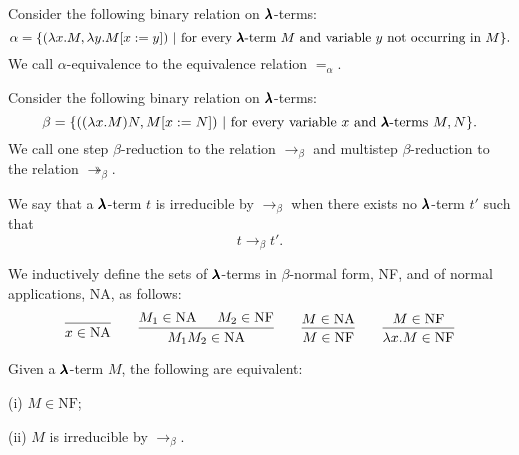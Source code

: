 \begin{definition}
  Consider the following binary relation on $\pmb{\lambda}$-terms:  
  \[
    \alpha = \{ (\lambda x . M, \lambda y . M[x := y]) \
                | \ \text{for every $\pmb{\lambda}$-term $M$ and variable $y$ not occurring in $M$} \}.
  \]  
  We call $\alpha$-equivalence to the equivalence relation $=_\alpha$.
\end{definition}


\begin{definition}
  \label{beta-reduction}
  Consider the following binary relation on $\pmb{\lambda}$-terms:  
  \[
    \beta = \{ ((\lambda x . M) N, M[x := N]) \
                | \ \text{for every variable $x$ and $\pmb{\lambda}$-terms $M, N$} \}.
  \]  
  We call one step $\beta$-reduction to the relation $\to_\beta$ and multistep $\beta$-reduction to the relation $\twoheadrightarrow_\beta$.
\end{definition}


\begin{definition}
  We say that a $\pmb{\lambda}$-term $t$ is irreducible by $\to_\beta$ when there exists no $\pmb{\lambda}$-term $t'$ such that
  \[ t \to_\beta t' . \]
\end{definition}


\begin{definition}
  \label{beta_nfs}
  We inductively define the sets of $\pmb{\lambda}$-terms in $\beta$-normal form, NF, and of normal applications, NA, as follows:
  \[
    \begin{prooftree}
      \infer0{ x \in \text{NA} } 
    \end{prooftree}
    \qquad
    \begin{prooftree}
      \hypo{ M_1 \in \text{NA} }
      \hypo{ M_2 \in \text{NF} }            
      \infer2{ M_1 M_2 \in \text{NA} } 
    \end{prooftree}
    \qquad
    \begin{prooftree}
      \hypo{ M \in \text{NA} }
      \infer1{ M \in \text{NF} } 
    \end{prooftree}
    \qquad
    \begin{prooftree}
      \hypo{ M \in \text{NF} }
      \infer1{ \lambda x . M \in \text{NF} } 
    \end{prooftree}
  \]
\end{definition}

\begin{claim}
  \label{beta_nfs_claim}
  Given a $\pmb{\lambda}$-term $M$, the following are equivalent:

  (i) $M \in \text{NF}$;

  (ii) $M$ is irreducible by $\to_\beta$.
\end{claim}

